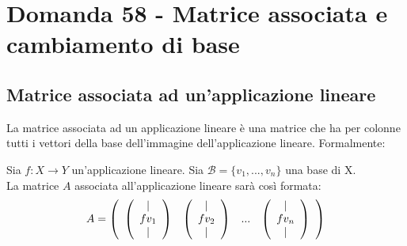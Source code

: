\documentclass[]{article}
\begin{document}
\section{Domanda 58 - Matrice associata e cambiamento di base}
\subsection*{Matrice associata ad un'applicazione lineare}
La matrice associata ad un applicazione lineare è una matrice che ha per colonne tutti i vettori della base dell'immagine dell'applicazione lineare.
Formalmente:
\begin{definizione}
Sia $f:X\rightarrow Y$ un'applicazione lineare. Sia $\mathscr{B}=\{v_1, ...,v_n\}$ una base di X. \\La matrice $A$ associata all'applicazione lineare sarà così formata:\\
$$A = \left ( 
	\begin{array}{c c c c}
		\left(\begin{array}{c}
			| \\
			fv_1\\
			|
			\end{array}
		\right) &
		\left(\begin{array}{c}
			| \\
			fv_2\\
			|
			\end{array}
		\right) & ... & \left(\begin{array}{c}
			| \\
			fv_n\\
			|
			\end{array}
		\right) 
	\end{array}
\right)
$$
\end{definizione}
\end{document}
